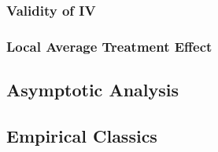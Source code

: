 \documentclass[12pt]{report}
\begin{document}
\subsubsection{Validity of IV}

\subsubsection{Local Average Treatment Effect}

\subsection{Asymptotic Analysis}

\subsection{Empirical Classics}
\end{document}
